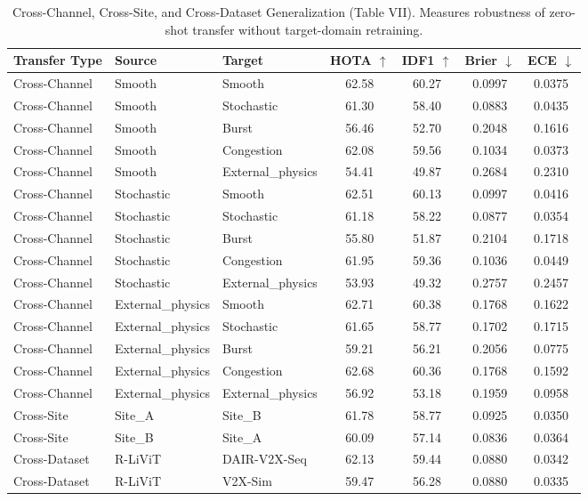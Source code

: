 \begin{table}[!t]
\caption{Cross-Channel, Cross-Site, and Cross-Dataset Generalization (Table VII). Measures robustness of zero-shot transfer without target-domain retraining.}
\label{tab:cross_channel_and_domain}
\centering
\small
\begin{tabular}{lllcccc}
\toprule
Transfer Type & Source & Target & HOTA $\uparrow$ & IDF1 $\uparrow$ & Brier $\downarrow$ & ECE $\downarrow$ \\
\midrule
Cross-Channel & Smooth & Smooth & 62.58 & 60.27 & 0.0997 & 0.0375 \\
Cross-Channel & Smooth & Stochastic & 61.30 & 58.40 & 0.0883 & 0.0435 \\
Cross-Channel & Smooth & Burst & 56.46 & 52.70 & 0.2048 & 0.1616 \\
Cross-Channel & Smooth & Congestion & 62.08 & 59.56 & 0.1034 & 0.0373 \\
Cross-Channel & Smooth & External_physics & 54.41 & 49.87 & 0.2684 & 0.2310 \\
Cross-Channel & Stochastic & Smooth & 62.51 & 60.13 & 0.0997 & 0.0416 \\
Cross-Channel & Stochastic & Stochastic & 61.18 & 58.22 & 0.0877 & 0.0354 \\
Cross-Channel & Stochastic & Burst & 55.80 & 51.87 & 0.2104 & 0.1718 \\
Cross-Channel & Stochastic & Congestion & 61.95 & 59.36 & 0.1036 & 0.0449 \\
Cross-Channel & Stochastic & External_physics & 53.93 & 49.32 & 0.2757 & 0.2457 \\
Cross-Channel & External_physics & Smooth & 62.71 & 60.38 & 0.1768 & 0.1622 \\
Cross-Channel & External_physics & Stochastic & 61.65 & 58.77 & 0.1702 & 0.1715 \\
Cross-Channel & External_physics & Burst & 59.21 & 56.21 & 0.2056 & 0.0775 \\
Cross-Channel & External_physics & Congestion & 62.68 & 60.36 & 0.1768 & 0.1592 \\
Cross-Channel & External_physics & External_physics & 56.92 & 53.18 & 0.1959 & 0.0958 \\
\midrule
Cross-Site & Site_A & Site_B & 61.78 & 58.77 & 0.0925 & 0.0350 \\
Cross-Site & Site_B & Site_A & 60.09 & 57.14 & 0.0836 & 0.0364 \\
\midrule
Cross-Dataset & R-LiViT & DAIR-V2X-Seq & 62.13 & 59.44 & 0.0880 & 0.0342 \\
Cross-Dataset & R-LiViT & V2X-Sim & 59.47 & 56.28 & 0.0880 & 0.0335 \\
\bottomrule
\end{tabular}
\end{table}